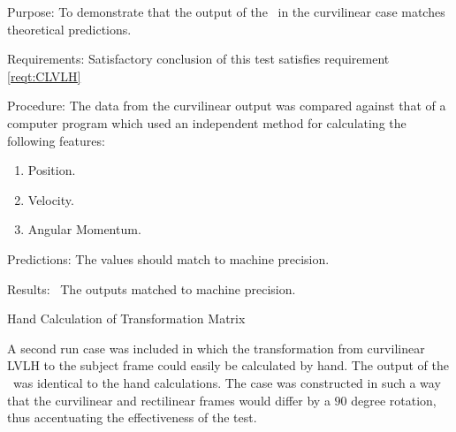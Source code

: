 \label{test:CLVLH}

\begin{description}
\item{Purpose:}\newline
To demonstrate that the output of the \LRDSDesc\ in the curvilinear case
matches theoretical predictions.
\item{Requirements:}\newline
Satisfactory conclusion of this test satisfies requirement \ref{reqt:CLVLH}

\item{Procedure:}\newline
The data from the curvilinear output was compared against that of a computer
program which used an independent method for calculating the following features:
\begin{enumerate}
 \item  {Position.}
 \item  {Velocity.}
 \item  {Angular Momentum.}
\end{enumerate}

\item{Predictions:}
The values should match to machine precision.

\item{Results:}\ \newline
The outputs matched to machine precision.

\item {Hand Calculation of Transformation Matrix}

A second run case was included in which the transformation from curvilinear
LVLH to the subject frame could easily be calculated by hand. The output of
the \LRDSDesc\ was identical to the hand calculations. The case was constructed
in such a way that the curvilinear and rectilinear frames would differ by a
$90$ degree rotation, thus accentuating the effectiveness of the test.
\end{description}
